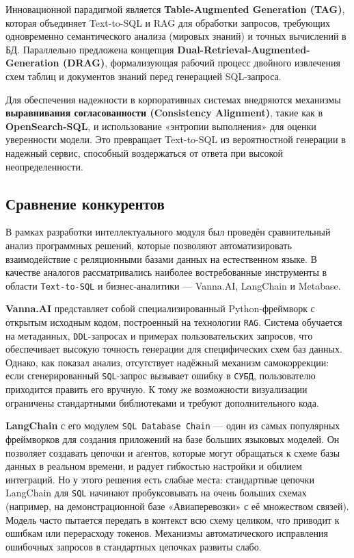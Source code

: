 Инновационной парадигмой является \textbf{Table-Augmented Generation (TAG)}, которая объединяет Text-to-SQL и RAG для обработки запросов, требующих одновременно семантического анализа (мировых знаний) и точных вычислений в БД. \cite{biswal2024tag} Параллельно предложена концепция \textbf{Dual-Retrieval-Augmented-Generation (DRAG)}, формализующая рабочий процесс двойного извлечения схем таблиц и документов знаний перед генерацией SQL-запроса. \cite{ji2026benchmarks}

Для обеспечения надежности в корпоративных системах внедряются механизмы \textbf{выравнивания согласованности (Consistency Alignment)}, такие как в \textbf{OpenSearch-SQL}, и использование «энтропии выполнения» для оценки уверенности модели. \cite{xie2025opensearch, chen2026rts} Это превращает Text-to-SQL из вероятностной генерации в надежный сервис, способный воздержаться от ответа при высокой неопределенности. \cite{chen2026rts}


\subsection{Сравнение конкурентов}

В рамках разработки интеллектуального модуля был проведён сравнительный анализ программных решений, которые позволяют автоматизировать взаимодействие с реляционными базами данных на естественном языке. В качестве аналогов рассматривались наиболее востребованные инструменты в области \texttt{Text-to-SQL} и бизнес-аналитики — Vanna.AI, LangChain и Metabase.

\textbf{Vanna.AI} представляет собой специализированный Python-фреймворк с открытым исходным кодом, построенный на технологии \texttt{RAG}. Система обучается на метаданных, \texttt{DDL}-запросах и примерах пользовательских запросов, что обеспечивает высокую точность генерации для специфических схем баз данных. Однако, как показал анализ, отсутствует надёжный механизм самокоррекции: если сгенерированный \texttt{SQL}-запрос вызывает ошибку в \texttt{СУБД}, пользователю приходится править его вручную. К тому же возможности визуализации ограничены стандартными библиотеками и требуют дополнительного кода.

\textbf{LangChain} с его модулем \texttt{SQL Database Chain} — один из самых популярных фреймворков для создания приложений на базе больших языковых моделей. \cite{official_langchain} Он позволяет создавать цепочки и агентов, которые могут обращаться к схеме базы данных в реальном времени, и радует гибкостью настройки и обилием интеграций. Но у этого решения есть слабые места: стандартные цепочки LangChain для \texttt{SQL} начинают пробуксовывать на очень больших схемах (например, на демонстрационной базе «Авиаперевозки» с её множеством связей). Модель часто пытается передать в контекст всю схему целиком, что приводит к ошибкам или перерасходу токенов. Механизмы автоматического исправления ошибочных запросов в стандартных цепочках развиты слабо.

